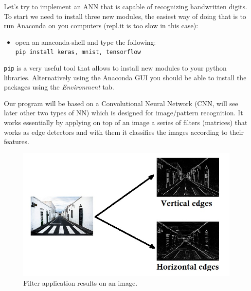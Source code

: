 \documentclass[11pt]{article}
\providecommand{\tightlist}{%
      \setlength{\itemsep}{0pt}\setlength{\parskip}{0pt}}
\begin{document}
Let's try to implement an ANN that is capable of recognizing handwritten
digits. To start we need to install three new modules, the easiest way
of doing that is to run Anaconda on you computers (repl.it is too slow
in this case):

\begin{itemize}
\tightlist
\item
  open an anaconda-shell and type the following:
  \texttt{pip\ install\ keras,\ mnist,\ tensorflow}
\end{itemize}

\texttt{pip} is a very useful tool that allows to install new modules to
your python libraries. Alternatively using the Anaconda GUI you should be
able to install the packages using the \emph{Environment} tab.

Our program will be based on a Convolutional Neural Network (CNN, will
see later other two types of NN) which is designed for image/pattern
recognition. It works essentially by applying on top of an image a
series of filters (matrices) that works as edge detectors and with them
it classifies the images according to their features.

\begin{figure}
  \centering
  \includegraphics{edges.jpg}
  \caption{Filter application results on an image.}
\end{figure}
\end{document}
